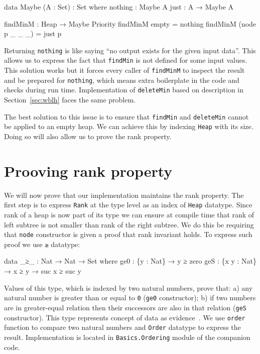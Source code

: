 \begin{code}
data Maybe (A : Set) : Set where
  nothing : Maybe A
  just    : A → Maybe A

findMinM : Heap → Maybe Priority
findMinM empty          = nothing
findMinM (node p _ _ _) = just p
\end{code}

\noindent
Returning \texttt{nothing} is like saying ``no output exists for the given input data''. This allows us to express the fact that \texttt{findMin} is not defined for some input values. This solution works but it forces every caller of \texttt{findMinM} to inspect the result and be prepared for \texttt{nothing}, which means extra boilerplate in the code and checks during run time. Implementation of \texttt{deleteMin} based on description in Section~\ref{sec:wblh} faces the same problem.

The best solution to this issue is to ensure that \texttt{findMin} and \texttt{deleteMin} cannot be applied to an empty heap. We can achieve this by indexing \texttt{Heap} with its size. Doing so will also allow us to prove the rank property.

\section[Prooving rank property]{Prooving rank property} \label{sec:rank-property}

We will now prove that our implementation maintains the rank property. The first step is to express \texttt{Rank} at the type level as an index of \texttt{Heap} datatype. Since rank of a heap is now part of its type we can ensure at compile time that rank of left subtree is not smaller than rank of the right subtree. We do this be requiring that \texttt{node} constructor is given a proof that rank invariant holds. To express such proof we use \texttt{≥} datatype:

\begin{code}
data _≥_ : Nat → Nat → Set where
  ge0 : \{y : Nat\} → y ≥ zero
  geS : \{x y : Nat\} → x ≥ y → suc x ≥ suc y
\end{code}
\noindent
Values of this type, which is indexed by two natural numbers, prove that: a) any natural number is greater than or equal to \texttt{0} (\texttt{ge0} constructor); b) if two numbers are in greater-equal relation then their successors are also in that relation (\texttt{geS} constructor). This type represents concept of data as evidence~\cite{AltMcBMcK05}. We use \texttt{order} function to compare two natural numbers and \texttt{Order} datatype to express the result. Implementation is located in \texttt{Basics.Ordering} module of the companion code.


